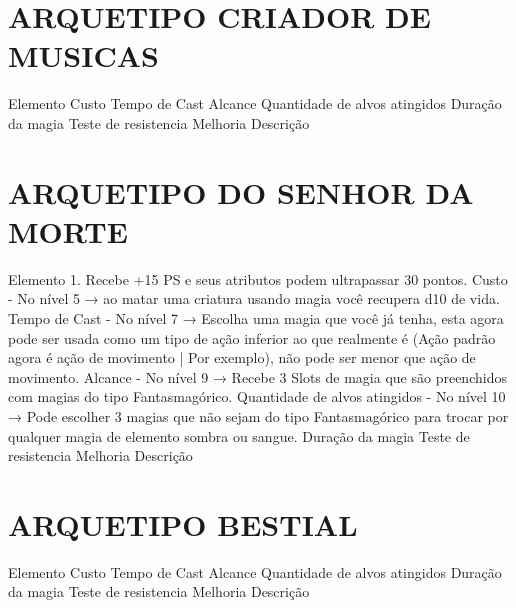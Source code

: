 \documentclass{article}%
\begin{document}
%
\section{ARQUETIPO CRIADOR DE MUSICAS}%
\label{sec:ARQUETIPOCRIADORDEMUSICAS}%
Elemento \newline%
Custo \newline%
Tempo de Cast \newline%
Alcance \newline%
Quantidade de alvos atingidos \newline%
Duração da magia \newline%
Teste de resistencia \newline%
Melhoria \newline%
Descrição \newline%

%
\section{ARQUETIPO DO SENHOR DA MORTE}%
\label{sec:ARQUETIPODOSENHORDAMORTE}%
Elemento 1. Recebe +15 PS e seus atributos podem ultrapassar 30 pontos.\newline%
Custo {-} No nível 5 → ao matar uma criatura usando magia você recupera d10 de vida.\newline%
Tempo de Cast {-} No nível 7 → Escolha uma magia que você já tenha, esta agora pode ser usada como um tipo de ação inferior ao que realmente é (Ação padrão agora é ação de movimento | Por exemplo), não pode ser menor que ação de movimento.\newline%
Alcance {-} No nível 9 → Recebe 3 Slots de magia que são preenchidos com magias do tipo Fantasmagórico.\newline%
Quantidade de alvos atingidos {-} No nível 10 → Pode escolher 3 magias que não sejam do tipo Fantasmagórico para trocar por qualquer magia de elemento sombra ou sangue.\newline%
Duração da magia \newline%
Teste de resistencia \newline%
Melhoria \newline%
Descrição \newline%

%
\section{ARQUETIPO BESTIAL}%
\label{sec:ARQUETIPOBESTIAL}%
Elemento \newline%
Custo \newline%
Tempo de Cast \newline%
Alcance \newline%
Quantidade de alvos atingidos \newline%
Duração da magia \newline%
Teste de resistencia \newline%
Melhoria \newline%
Descrição \newline%
\end{document}
